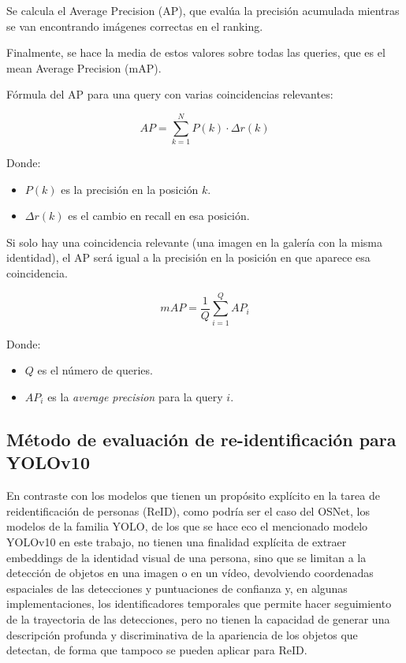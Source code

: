 \documentclass[12pt, a4paper, twoside]{article}
\begin{document}
	
	Se calcula el Average Precision (AP), que evalúa la precisión acumulada mientras se van encontrando imágenes correctas en el ranking.
	
	
	Finalmente, se hace la media de estos valores sobre todas las queries, que es el mean Average Precision (mAP).
	
	
	Fórmula del AP para una query con varias coincidencias relevantes:
	
	\begin{equation}
		AP = \sum_{k=1}^N P(k) \cdot \Delta r(k)
	\end{equation}
	
	Donde:
	
	\begin{itemize}
		\item $P(k)$ es la precisión en la posición $k$.
		\item $\Delta r(k)$ es el cambio en recall en esa posición.
	\end{itemize}
	
	Si solo hay una coincidencia relevante (una imagen en la galería con la misma identidad), el AP será igual a la precisión en la posición en que aparece esa coincidencia.
	
	\begin{equation}
		mAP = \frac{1}{Q} \sum_{i=1}^{Q} AP_i
	\end{equation}
	
	Donde:
	
	\begin{itemize}
		\item $Q$ es el número de queries.
		\item $AP_i$ es la \textit{average precision} para la query $i$.
	\end{itemize}
	
 	\subsection{Método de evaluación de re-identificación para YOLOv10} \cite{7410490}
 	
 	En contraste con los modelos que tienen un propósito explícito en la tarea de reidentificación de personas (ReID), como podría ser el caso del OSNet, los modelos de la familia YOLO, de los que se hace eco el mencionado modelo YOLOv10 en este trabajo, no tienen una finalidad explícita de extraer embeddings de la identidad visual de una persona, sino que se limitan a la detección de objetos en una imagen o en un vídeo, devolviendo coordenadas espaciales de las detecciones y puntuaciones de confianza y, en algunas implementaciones, los identificadores temporales que permite hacer seguimiento de la trayectoria de las detecciones, pero no tienen la capacidad de generar una descripción profunda y discriminativa de la apariencia de los objetos que detectan, de forma que tampoco se pueden aplicar para ReID.
 	
\end{document}
